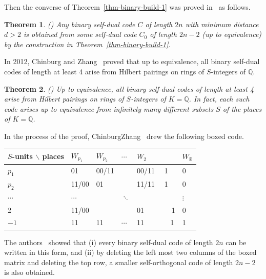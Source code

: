 \documentclass[12pt]{article}
\newtheorem{theorem}{Theorem}[section]
\begin{document}
Then the converse of Theorem~\ref{thm-binary-build-1} was proved in~\cite{Kim2001} as follows. 

\begin{theorem} (\cite[Theorem 2]{Kim2001})  \label{thm-binary-build-2}
 Any binary self-dual code $C$ of length $2n$ with minimum distance $d>2$ is obtained from some self-dual code $C_0$ of length
$2n-2$ (up to equivalence) by the construction in Theorem~\ref{thm-binary-build-1}.
\end{theorem}

In 2012, Chinburg and Zhang~\cite{ChinburgZhang} proved that up to equivalence, all binary self-dual codes of length at least 4 arise from Hilbert pairings on rings of $S$-integers of $\mathbb Q$.
 
\begin{theorem}(\cite[Theorem 1.5]{ChinburgZhang})  \label{thm-binary-hilbert-2}
Up to equivalence, all binary self-dual codes of length at least 4 arise from Hilbert pairings on rings of $S$-integers of $K= \mathbb Q$. In fact, each such code arises up to equivalence from infinitely many different subsets $S$ of the places of $K=\mathbb Q$.
\end{theorem}

In the process of the proof, ChinburgZhang~\cite{ChinburgZhang} drew the following boxed code.

\begin{center}
\begin{tabular}{|l|lllll|}
\toprule
$S$-units $\backslash$  places & $W_{p_1}$  & $W_{p_2}$ & $\cdots$ & $W_2$  & $W_{\mathbb R}$ \\
\midrule
$p_1$  & 01   & 00/11  &  & 00/11 ~~1  &  0 \\
$p_2$  & 11/00   & 01  &  & 11/11 ~~1  &  0 \\
$\cdots$ & $\cdots$ &   &  $\ddots$ &   & $\vdots$ \\
2  & 11/00   &   &   & 01 ~~~~~~~1  &  0 \\
$-1$ & 11      & 11 & $\cdots$ & 11 ~~~~~~ 1 &  1 \\
\bottomrule 
\end{tabular}
\end{center}

The authors~\cite{ChinburgZhang} showed that (i) every binary self-dual code of length $2n$ can be written in this form, and (ii) by deleting the left most two columns of the boxed matrix and deleting the top row, a smaller self-orthogonal code of length $2n-2$ is also obtained. 
\end{document}
